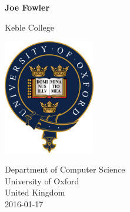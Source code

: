 \begin{titlepage}
    \begin{center}
      \vspace*{1cm}

      \huge
      \textbf{\projecttitle}

      \vspace{0.5cm}
      \large \projectsubtitle

      \vspace{1.5cm}

      \textbf{Joe Fowler}

      Keble College

      \vfill

      \includegraphics[width=0.3\textwidth]{images/OxfordLogo}

      \vspace{1cm}

      \large
      Department of Computer Science\\
      University of Oxford\\
      United Kingdom\\
      2016-01-17
    \end{center}
  \restoregeometry
\end{titlepage}
